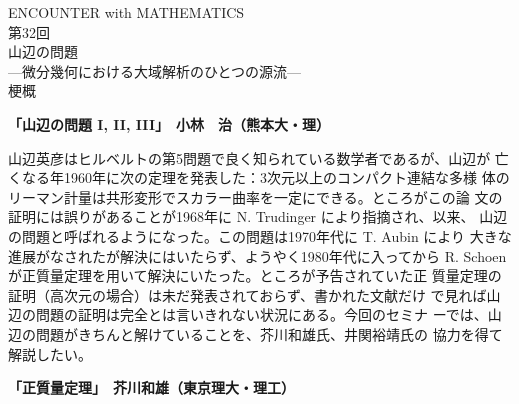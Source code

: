 \documentclass[uplatex,dvipdfmx]{jlreq}
\begin{document}
\begin{center}
{\Large ENCOUNTER with MATHEMATICS}\\
第32回\\
{\LARGE 山辺の問題}\\
---微分幾何における大域解析のひとつの源流---\\
梗概
\vspace{5pt}
\end{center}

\vfill

\newpage

\noindent
{\bfseries\large「山辺の問題 I, II, III」\hfill　小林　治（熊本大・理）}

\vspace{6pt}

山辺英彦はヒルベルトの第5問題で良く知られている数学者であるが、山辺が
亡くなる年1960年に次の定理を発表した：3次元以上のコンパクト連結な多様
体のリーマン計量は共形変形でスカラー曲率を一定にできる。ところがこの論
文の証明には誤りがあることが1968年に N. Trudinger により指摘され、以来、
山辺の問題と呼ばれるようになった。この問題は1970年代に T. Aubin により
大きな進展がなされたが解決にはいたらず、ようやく1980年代に入ってから
R. Schoen が正質量定理を用いて解決にいたった。ところが予告されていた正
質量定理の証明（高次元の場合）は未だ発表されておらず、書かれた文献だけ
で見れば山辺の問題の証明は完全とは言いきれない状況にある。今回のセミナ
ーでは、山辺の問題がきちんと解けていることを、芥川和雄氏、井関裕靖氏の
協力を得て解説したい。

\bigskip

\noindent
{\bfseries\large「正質量定理」\hfill　芥川和雄（東京理大・理工）}

\vspace{6pt}
\end{document}
